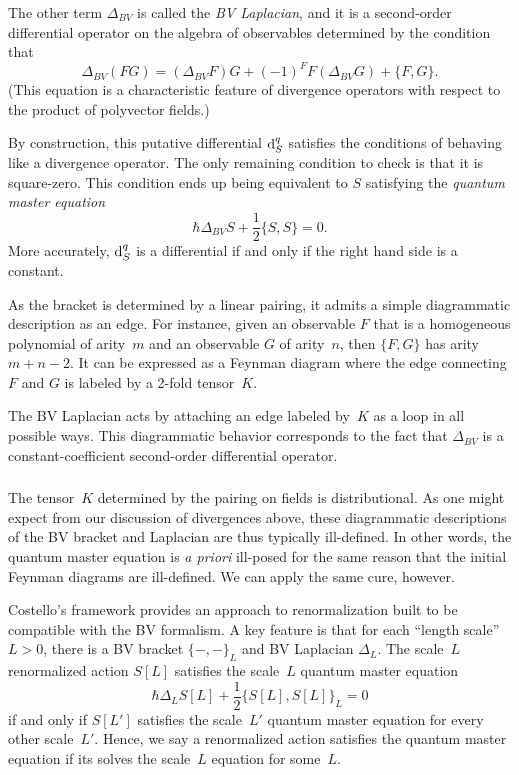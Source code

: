 The other term $\Delta_{BV}$ is called the {\em BV Laplacian}, 
and it is a second-order differential operator on the algebra of observables 
determined by the condition that
\[
\Delta_{BV}(FG) = (\Delta_{BV}F)G + (-1)^F F(\Delta_{BV}G) + \{F,G\}.
\]
(This equation is a characteristic feature of divergence operators with respect to the product of polyvector fields.)

By construction, this putative differential ${\rm d}_S^q$ satisfies the conditions of behaving like a divergence operator.
The only remaining condition to check is that it is square-zero.
This condition ends up being equivalent to $S$ satisfying the {\em quantum master equation}
\begin{equation}
\hbar \Delta_{BV} S + \frac{1}{2}\{S,S\} = 0.
\end{equation}
More accurately, ${\rm d}^q_S$ is a differential if and only if the right hand side is a constant.

As the bracket is determined by a linear pairing,
it admits a simple diagrammatic description as an edge.
For instance, given an observable $F$ that is a homogeneous polynomial of arity~$m$
and an observable $G$ of arity~$n$, 
then $\{F,G\}$ has arity~$m+n-2$.
It can be expressed as a Feynman diagram 
where the edge connecting $F$ and $G$ is labeled by a 2-fold tensor~$K$.

The BV Laplacian acts by attaching an edge labeled by~$K$ as a loop in all possible ways.
This diagrammatic behavior corresponds to the fact that $\Delta_{BV}$ is a constant-coefficient second-order differential operator.

\subsubsection{}

The tensor~$K$ determined by the pairing on fields is distributional.
As one might expect from our discussion of divergences above,
these diagrammatic descriptions of the BV bracket and Laplacian are thus typically ill-defined.
In other words, the quantum master equation is {\em a priori} ill-posed for the same reason that the initial Feynman diagrams are ill-defined.
We can apply the same cure, however.

Costello's framework \cite{CosBook} provides an approach to renormalization built to be compatible with the BV formalism.
A key feature is that for each ``length scale''~$L>0$, 
there is a BV bracket $\{-,-\}_L$ and BV Laplacian $\Delta_L$.
The scale~$L$ renormalized action $S[L]$ satisfies the scale~$L$ quantum master equation
\[
\hbar \Delta_{L} S[L] + \frac{1}{2}\{S[L],S[L]\}_L = 0
\]
if and only if $S[L']$ satisfies the scale~$L'$ quantum master equation for every other scale~$L'$.
Hence, we say a renormalized action satisfies the quantum master equation if its solves the scale~$L$ equation for some~$L$.

